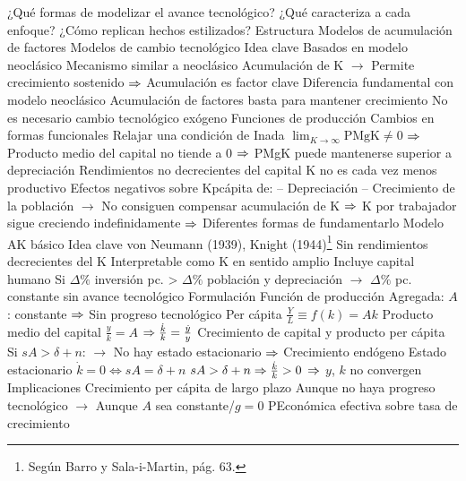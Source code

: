 \documentclass{nuevotema}
\begin{document}
\begin{esquemal}
			\3 ¿Qué formas de modelizar el avance tecnológico?
			\3 ¿Qué caracteriza a cada enfoque?
			\3 ¿Cómo replican hechos estilizados?
		\2 Estructura
			\3 Modelos de acumulación de factores
			\3 Modelos de cambio tecnológico
	\1 
		\2 Idea clave
			\3 Basados en modelo neoclásico
				\4 Mecanismo similar a neoclásico
				\4[] Acumulación de K
				\4[] $\to$ Permite crecimiento sostenido
				\4[] $\Rightarrow$ Acumulación es factor clave
			\3 Diferencia fundamental con modelo neoclásico
				\4 Acumulación de factores basta para mantener crecimiento
				\4 No es necesario cambio tecnológico exógeno
			\3 Funciones de producción
				\4 Cambios en formas funcionales
				\4[] Relajar una condición de Inada
				\4[] $\lim_{K \to \infty} \text{PMgK} \neq 0$
				\4[] $\Rightarrow$ Producto medio del capital no tiende a 0
				\4[] $\Rightarrow$ PMgK puede mantenerse superior a depreciación
			\3 Rendimientos no decrecientes del capital
				\4 K no es cada vez menos productivo
				\4[] Efectos negativos sobre Kpcápita  de:
				\4[] -- Depreciación
				\4[] -- Crecimiento de la población
				\4[] $\to$ No consiguen compensar acumulación de K
				\4[] $\Rightarrow$ K por trabajador sigue creciendo indefinidamente
				\4[] $\Rightarrow$ Diferentes formas de fundamentarlo
		\2 Modelo AK básico
			\3 Idea clave
				\4 von Neumann (1939), Knight (1944)\footnote{Según Barro y Sala-i-Martin, pág. 63.}
				\4 Sin rendimientos decrecientes del K
				\4[] Interpretable como K en sentido amplio
				\4[] Incluye capital humano
				\4 Si $\Delta \%$ inversión pc. > $\Delta \%$ población y depreciación
				\4[]$\to$ $\Delta \%$ pc. constante sin avance tecnológico
			\3 Formulación
				\4 Función de producción
				\4[] Agregada:
				\4[] 
				\4[] $A$: constante $\Rightarrow$ Sin progreso tecnológico
				\4[] Per cápita
				\4[] $\frac{Y}{L} \equiv f(k) =  Ak$
				\4 Producto medio del capital
				\4[] $\frac{y}{k} = A$
				\4[] $\Rightarrow \frac{\dot{k}}{k} = \frac{\dot{y}}{y}$
				\4 Crecimiento de capital y producto per cápita
				\4[] 
				\4[] Si $sA > \delta + n $:
				\4[] $\to$ No hay estado estacionario
				\4[] $\Rightarrow$ Crecimiento endógeno
				\4 Estado estacionario
				\4[] $\dot{k} = 0 \iff sA = \delta + n $
				\4[] $sA > \delta + n \Rightarrow \frac{\dot{k}}{k} > 0$
				\4[] $\Rightarrow$ $y$, $k$ no convergen
				\4[] 
			\3 Implicaciones
				\4 Crecimiento per cápita de largo plazo
				\4[] Aunque no haya progreso tecnológico
				\4[] $\to$ Aunque $A$ sea constante/$g=0$
				\4 PEconómica efectiva sobre tasa de crecimiento

\end{esquemal}
\end{document}
